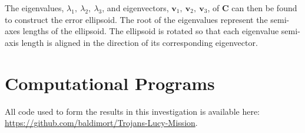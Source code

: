 \documentclass[10pt, twocolumn]{revtex4}    %
\begin{document}
The eigenvalues, $\lambda_1,\ \lambda_2,\ \lambda_3$, and eigenvectors, $\mathbf{v}_1,\ \mathbf{v}_2,\ \mathbf{v}_3$, of $\mathbf{C}$ can then be found to construct the error ellipsoid. The root of the eigenvalues represent the semi-axes lengths of the ellipsoid. The ellipsoid is rotated so that each eigenvalue semi-axis length is aligned in the direction of its corresponding eigenvector.

\section{Computational Programs}

All code used to form the results in this investigation is available here: \url{https://github.com/baldimort/Trojans-Lucy-Mission}.
\end{document}

